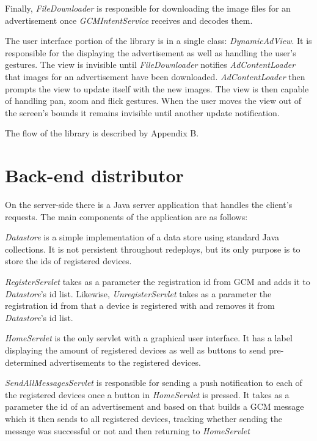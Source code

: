 Finally, \textit{FileDownloader} is responsible for downloading the image files for an advertisement once \textit{GCMIntentService} receives and decodes them.

The user interface portion of the library is in a single class: \textit{DynamicAdView}. It is responsible for the displaying the advertisement as well as handling the user's gestures. The view is invisible until \textit{FileDownloader} notifies \textit{AdContentLoader} that images for an advertisement have been downloaded. \textit{AdContentLoader} then prompts the view to update itself with the new images. The view is then capable of handling pan, zoom and flick gestures. When the user moves the view out of the screen's bounds it remains invisible until another update notification.

The flow of the library is described by Appendix B.

\section{Back-end distributor}

On the server-side there is a Java server application that handles the client's requests. The main components of the application are as follows:

\textit{Datastore} is a simple implementation of a data store using standard Java collections. It is not persistent throughout redeploys, but its only purpose is to store the ids of registered devices.

\textit{RegisterServlet} takes as a parameter the registration id from GCM and adds it to \textit{Datastore}'s id list. Likewise, \textit{UnregisterServlet} takes as a parameter the registration id from that a device is registered with and removes it from \textit{Datastore}'s id list.

\textit{HomeServlet} is the only servlet with a graphical user interface. It has a label displaying the amount of registered devices as well as buttons to send pre-determined advertisements to the registered devices.

\textit{SendAllMessagesServlet} is responsible for sending a push notification to each of the registered devices once a button in \textit{HomeServlet} is pressed. It takes as a parameter the id of an advertisement and based on that builds a GCM message which it then sends to all registered devices, tracking whether sending the message was successful or not and then returning to \textit{HomeServlet}


